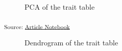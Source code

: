 \documentclass[
]{agujournal2019}
\begin{document}
\begin{figure}[H]


\caption{\label{fig-pca}PCA of the trait table}

\end{figure}%

\textsubscript{Source:
\href{https://BecksLab.github.io/ms_t_is_for_topology/index.qmd.html}{Article
Notebook}}

\begin{figure}[H]


\caption{\label{fig-dendo}Dendrogram of the trait table}

\end{figure}%
\end{document}
